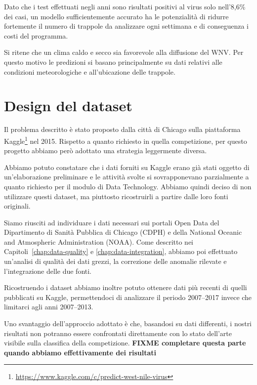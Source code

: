 Dato che i test effettuati negli anni sono risultati positivi al virus solo 
nell'8,6\% dei casi, un modello sufficientemente accurato ha le potenzialità di 
ridurre fortemente il numero di trappole da analizzare ogni settimana e di 
conseguenza i costi del programma. 


Si ritene che un clima caldo e secco sia favorevole alla diffusione del WNV. 
Per questo motivo le predizioni si basano principalmente su dati relativi alle 
condizioni meteorologiche e all'ubicazione delle trappole.

\section{Design del dataset}

Il problema descritto è stato proposto dalla città di Chicago sulla piattaforma 
Kaggle\footnote{\url{https://www.kaggle.com/c/predict-west-nile-virus}} nel 
2015. Rispetto a quanto richiesto in quella competizione, per questo progetto 
abbiamo però adottato una strategia leggermente diversa.

Abbiamo potuto constatare che i dati forniti su Kaggle erano già stati oggetto 
di un'elaborazione preliminare e le attività svolte si sovrapponevano 
parzialmente a quanto richiesto per il modulo di Data Technology. Abbiamo 
quindi deciso di non utilizzare questi dataset, ma piuttosto ricostruirli a 
partire dalle loro fonti originali.

Siamo riusciti ad individuare i dati necessari sui portali Open Data del 
Dipartimento di Sanità Pubblica di Chicago (CDPH) e della National Oceanic and 
Atmospheric Administration (NOAA). Come descritto nei 
Capitoli~\ref{chap:data-quality} e \ref{chap:data-integration}, abbiamo poi 
effettuato un'analisi di qualità dei dati grezzi, la correzione delle anomalie 
rilevate e l'integrazione delle due fonti.

Ricostruendo i dataset abbiamo inoltre potuto ottenere dati più recenti di 
quelli pubblicati su Kaggle, permettendoci di analizzare il periodo 2007--2017 
invece che limitarci agli anni 2007--2013.

Uno svantaggio dell'approccio adottato è che, basandosi su dati differenti, i 
nostri risultati non potranno essere confrontati direttamente con lo stato 
dell'arte visibile sulla classifica della competizione. \textbf{FIXME 
completare questa parte quando abbiamo effettivamente dei risultati}


